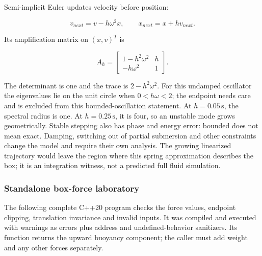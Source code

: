 Semi-implicit Euler updates velocity before position:

\[
v_{next}=v-h\omega^2x,\qquad x_{next}=x+h v_{next}.
\]

Its amplification matrix on \((x,v)^T\) is

\[
A_h=\begin{bmatrix}1-h^2\omega^2&h\\-h\omega^2&1\end{bmatrix}.
\]

The determinant is one and the trace is \(2-h^2\omega^2\). For this undamped oscillator the eigenvalues lie on the unit circle when \(0<h\omega<2\); the endpoint needs care and is excluded from this bounded-oscillation statement. At \(h=0.05\,\mathrm s\), the spectral radius is one. At \(h=0.25\,\mathrm s\), it is four, so an unstable mode grows geometrically. Stable stepping also has phase and energy error: bounded does not mean exact. Damping, switching out of partial submersion and other constraints change the model and require their own analysis. The growing linearized trajectory would leave the region where this spring approximation describes the box; it is an integration witness, not a predicted full fluid simulation.

\subsubsection{Standalone box-force laboratory}\label{standalone-box-force-laboratory}

The following complete C++20 program checks the force values, endpoint clipping, translation invariance and invalid inputs. It was compiled and executed with warnings as errors plus address and undefined-behavior sanitizers. Its function returns the upward buoyancy component; the caller must add weight and any other forces separately.

